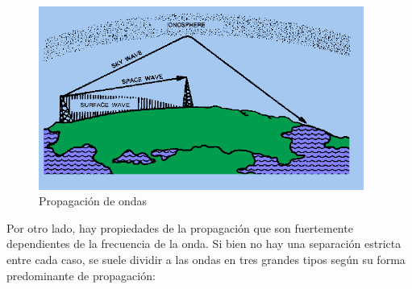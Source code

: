 \begin{figure}[!h]
  \centering
  \includegraphics[width=0.95\textwidth]{./Imagenes/06.01.adf/propagacion-ondas.gif}
  \caption{Propagaci\'on de ondas}
  \label{fig:propagacion.de.ondas}
\end{figure}

Por otro lado, hay propiedades de la propagaci\'on que son fuertemente dependientes de la frecuencia de la onda. Si bien no hay una separaci\'on estricta entre cada caso, se suele dividir a las ondas en tres grandes tipos seg\'un su forma predominante de propagaci\'on: 


